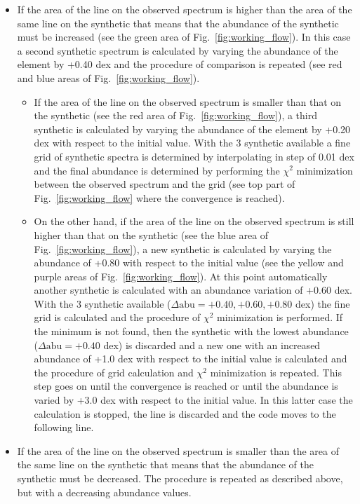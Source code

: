 \documentclass[modern]{aastex701}
\begin{document}
\begin{itemize}
    \item  If the area of the line on the observed spectrum is higher than the area of the same line on the synthetic that means that the abundance of the synthetic must be increased (see the green area of Fig.~\ref{fig:working_flow}). In this case a second synthetic spectrum is calculated by varying the abundance of the element by +0.40 dex and the procedure of comparison is repeated (see red and blue areas of Fig.~\ref{fig:working_flow}).
    \begin{itemize}
        \item If the area of the line on the observed spectrum is smaller than that on the synthetic (see the red area of Fig.~\ref{fig:working_flow}), a third synthetic is calculated by varying the abundance of the element by +0.20 dex with respect to the initial value. With the 3 synthetic available a fine grid of synthetic spectra is determined by interpolating in step of 0.01 dex and the final abundance is determined by performing the $\chi^2$ minimization between the observed spectrum and the grid (see top part of Fig.~\ref{fig:working_flow} where the convergence is reached). 
        \item On the other hand, if the area of the line on the observed spectrum is still higher than that on the synthetic (see the blue area of Fig.~\ref{fig:working_flow}), a new synthetic is calculated by varying the abundance of +0.80 with respect to the initial value (see the yellow and purple areas of Fig.~\ref{fig:working_flow}). At this point automatically another synthetic is calculated with an abundance variation of +0.60 dex. With the 3 synthetic available ($\Delta \mathrm{abu} = +0.40, +0.60, +0.80$ dex) the fine grid is calculated and the procedure of $\chi^2$ minimization is performed. If the minimum is not found, then the synthetic with the lowest abundance ($\Delta \mathrm{abu} = +0.40$ dex) is discarded and a new one with an increased abundance of +1.0 dex with respect to the initial value is calculated and the procedure of grid calculation and $\chi^2$ minimization is repeated. This step goes on until the convergence is reached or until the abundance is varied by +3.0 dex with respect to the initial value. In this latter case the calculation is stopped, the line is discarded and the code moves to the following line.
    \end{itemize}
    \item If the area of the line on the observed spectrum is smaller than the area of the same line on the synthetic that means that the abundance of the synthetic must be decreased. The procedure is repeated as described above, but with a decreasing abundance values.
\end{itemize}
\end{document}
